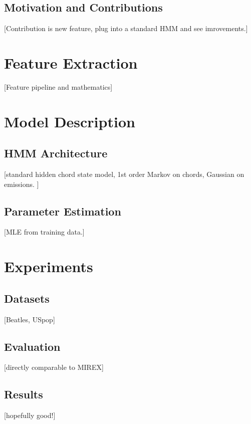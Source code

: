 \documentclass{article}
\begin{document}
\subsection{Motivation and Contributions}\label{sub:motivation}
[Contribution is new feature, plug into a standard HMM and see imrovements.]

\section{Feature Extraction}\label{sec:features}
[Feature pipeline and mathematics]

\section{Model Description}\label{sec:model}
\subsection{HMM Architecture}\label{sub:hmm}
[standard hidden chord state model, 1st order Markov on chords, Gaussian on emissions. ]

\subsection{Parameter Estimation}\label{sub:params}
[MLE from training data.]

\section{Experiments}\label{sec:exp}
\subsection{Datasets}\label{sub:data}
[Beatles, USpop]

\subsection{Evaluation}\label{sub:eval}
[directly comparable to MIREX]

\subsection{Results}\label{sub:results}
[hopefully good!]
\end{document}
